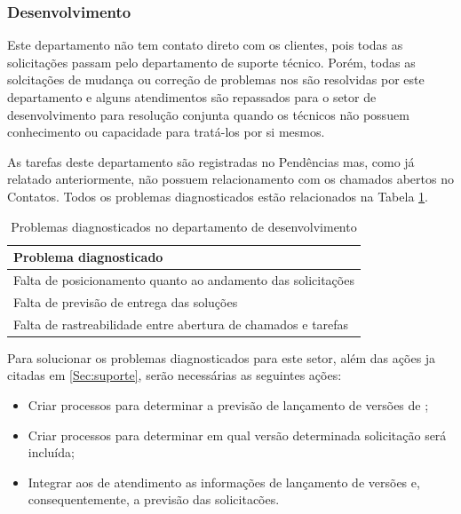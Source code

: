 \subsubsection{Desenvolvimento}
\label{Sec:desenvolvimento}

Este departamento não tem contato direto com os clientes, pois todas as solicitações passam pelo departamento de suporte técnico. Porém, todas as solcitações de mudança ou correção de problemas nos \sws são resolvidas por este departamento e alguns atendimentos são repassados para o setor de desenvolvimento para resolução conjunta quando os técnicos não possuem conhecimento ou capacidade para tratá-los por si mesmos. 

As tarefas deste departamento são registradas no \sw Pendências mas, como já relatado anteriormente, não possuem relacionamento com os chamados abertos no \sw Contatos. Todos os problemas diagnosticados estão relacionados na Tabela \ref{Tab:probl:desenv}.

\begin{table}[h!]\footnotesize
\centering
\begin{tabular}
{
 	|p{14cm}|
}

	\hline
	\textbf{Problema diagnosticado}\\
	\hline

	Falta de posicionamento quanto ao andamento das solicitações\\
	\hline

	Falta de previsão de entrega das soluções\\
	\hline

	Falta de rastreabilidade entre abertura de chamados e tarefas\\
	\hline

\end{tabular}
\caption {Problemas diagnosticados no departamento de desenvolvimento}
\label{Tab:probl:desenv}
\end{table}

Para solucionar os problemas diagnosticados para este setor, além das ações ja citadas em \ref{Sec:suporte}, serão necessárias as seguintes ações:

\begin{itemize}

\item Criar processos para determinar a previsão de lançamento de versões de \sws;

\item Criar processos para determinar em qual versão determinada solicitação será incluída;

\item Integrar aos \sws de atendimento as informações de lançamento de versões e, consequentemente, a previsão das solicitacões.

\end{itemize}

